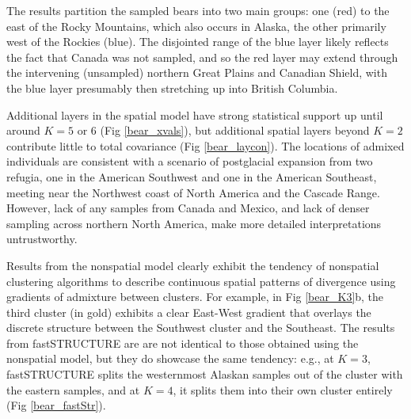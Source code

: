\documentclass[12pt]{article}
\begin{document}
The results partition the sampled bears into two main groups:
one (red) to the east of the Rocky Mountains, 
which also occurs in Alaska,
the other primarily west of the Rockies (blue).
The disjointed range of the blue layer likely reflects the fact
that Canada was not sampled, 
and so the red layer may extend
through the intervening (unsampled) northern Great Plains and Canadian Shield, 
with the blue layer presumably then stretching up into British Columbia.

Additional layers in the spatial model have strong statistical support 
up until around $K=5$ or 6 (Fig \ref{bear_xvals}),
but additional spatial layers beyond $K=2$ contribute little to total covariance (Fig \ref{bear_laycon}).
The locations of admixed individuals 
are consistent with a scenario of postglacial expansion from two refugia, 
one in the American Southwest and one in the American Southeast, 
meeting near the Northwest coast of North America and the Cascade Range.
However, lack of any samples from Canada and Mexico, 
and lack of denser sampling across northern North America, 
make more detailed interpretations untrustworthy.

Results from the nonspatial model clearly exhibit the tendency 
of nonspatial clustering algorithms to describe continuous spatial patterns of divergence 
using gradients of admixture between clusters.
For example, in Fig \ref{bear_K3}b, 
the third cluster (in gold) exhibits a clear East-West gradient that 
overlays the discrete structure between the Southwest cluster and the Southeast.
The results from fastSTRUCTURE are are not identical to 
those obtained using the nonspatial model, 
but they do showcase the same tendency: 
e.g., at $K=3$, fastSTRUCTURE splits the westernmost Alaskan samples 
out of the cluster with the eastern samples, 
and at $K=4$, it splits them into their own cluster entirely (Fig \ref{bear_fastStr}).
\end{document}
